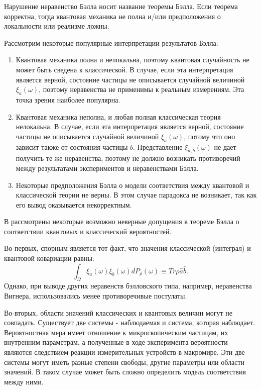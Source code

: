 \documentclass[%
master,         %
subf,           %
href,           %
colorlinks=true %
]{disser}
\numberwithin{equation}{section}
\numberwithin{figure}{section}
\begin{document}
Нарушение неравенство Бэлла носит название теоремы Бэлла. Если теорема корректна, тогда квантовая механика не полна и/или предположения о локальности или реализме ложны. 

Рассмотрим некоторые популярные интерпретации результатов Бэлла:
\begin{enumerate}
\item Квантовая механика полна и нелокальна, поэтому квантовая случайность не может быть сведена к классической. 
В случае, если эта интерпретация является верной, состояние частицы не описывается случайной величиной $\xi_a(\omega)$, поэтому неравенства не применимы к реальным измерениям. Эта точка зрения наиболее популярна.

\item Квантовая механика неполна, и любая полная классическая теория нелокальна. 
В случае, если эта интерпретация является верной, состояние частицы не описывается случайной величиной $\xi_a(\omega)$, потому что оно зависит также от состояния частицы $b$. Представление $\xi_{a,b}(\omega)$ не дает получить те же неравенства, поэтому не должно возникать противоречий между результатами экспериментов и неравенствами Бэлла.

\item Некоторые предположения Бэлла о модели соответствия между квантовой и классической теории не верны. В этом случае парадокса не возникает, так как его вывод оказывается некорректным. 
\end{enumerate}

В \cite{Khrennikov_information} рассмотрены некоторые возможно неверные допущения в теореме Бэлла о соответствии квантовых и классический вероятностей.

Во-первых, спорным является тот факт, что значения классической (интеграл) и квантовой ковариации равны:
$$\int_\Omega\xi_a(\omega)\xi_b(\omega)dP_\rho(\omega) \equiv Tr\rho\hat{a}\hat{b}.$$
Однако, при выводе других неравенств бэлловского типа, например, неравенства Вигнера, использовались менее противоречивые постулаты.

Во-вторых, области значений классических и квантовых величин могут не совпадать. Существует две системы - наблюдаемая и система, которая наблюдает. Вероятностная мера имеет отношение к микроскопическим частицам, их внутренним параметрам, а полученные в ходе эксперимента вероятности являются следствием реакции измерительных устройств в макромире. Эти две системы могут иметь разные степени свободы, другие параметры или области значений. В таком случае может быть сложно определить модель соответствия между ними.
\end{document}
